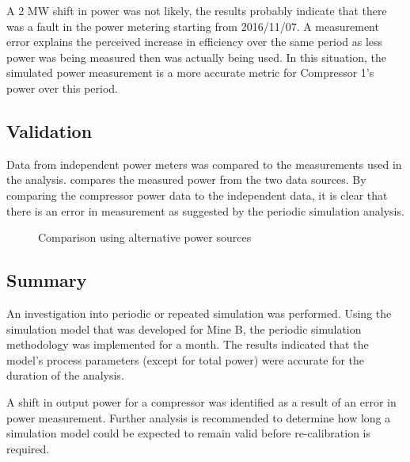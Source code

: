 A 2 MW shift in power was not likely, the results probably indicate that there was a fault in the power metering starting from 2016/11/07. A measurement error explains the perceived increase in efficiency over the same period as less power was being measured then was actually being used. In this situation, the simulated power measurement is a more accurate metric for Compressor 1’s power over this period.

 \subsection{Validation}
Data from independent power meters was compared to the measurements used in the analysis.   compares the measured power from the two data sources. By comparing the compressor power data to the independent data, it is clear that there is an error in measurement as suggested by the periodic simulation analysis.
	\begin{figure}[h!]
		\centering
		
		\caption{Comparison using alternative power sources}
		\label{fig: Corrected Periodic simulation}
	\end{figure} 
	
	\subsection{Summary}
	An investigation into periodic or repeated simulation was performed. Using the simulation model that was developed for Mine B, the periodic simulation methodology was implemented for a month. The results indicated that the model's process parameters (except for total power) were accurate for the duration of the analysis.
	\par 
	 A shift in output power for a compressor  was identified as a result of an error in power measurement. Further analysis is recommended to determine how long a simulation model could be expected to remain valid before re-calibration is required.
	 
